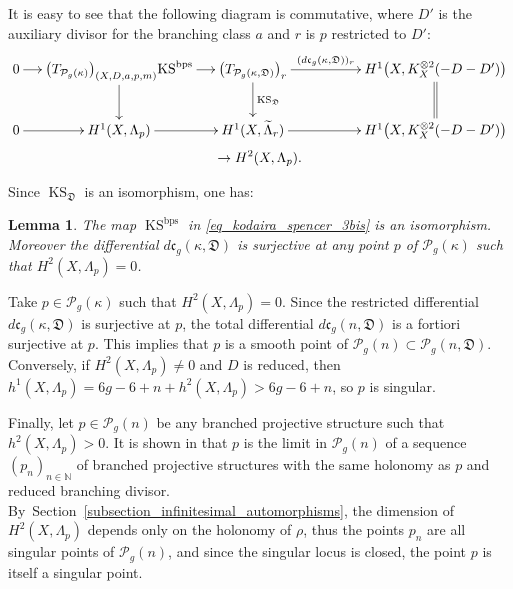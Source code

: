 \documentclass[10pt]{amsart}
\newcommand{\N}{\mathbb N}
\newcommand{\BPS}{\mathrm{bps}}
\DeclareMathOperator{\KS}{KS}
\theoremstyle{definition}
\theoremstyle{plain}
\newtheorem{lemma}[definition]{Lemma}
\begin{document}
It is easy to see that the following diagram is commutative, where $D'$ is the auxiliary divisor for the branching class $a$ and $r$ is $p$ restricted to $D'$:
\begin{multline*}
\xymatrix@C=.45cm{
0 \ar[r] & \bigl(T_{\mathcal P_g(\kappa)}\bigr)_{(X, D, a, p, m)} \ar[d]{\KS^{\BPS}} \ar[r] & \bigl(T_{\mathcal P_g(\kappa, \mathfrak D)}\bigr)_r \ar[d]^{\KS_{\mathfrak D}} \ar[rrr]^-{(d\mathfrak c_g(\kappa,\mathfrak D))_r} &&&H^1\bigl(X, K_X^{\otimes 2}(-D-D')\bigr) \ar@{=}[d]\\
0 \ar [r] & H^1(X, \Lambda_{p}) \ar[r] & H^1(X, \widetilde \Lambda_r) \ar[rrr]&&& H^1\bigl(X, K_X^{\otimes 2}(-D-D')\bigr)}\\
\\[-15pt]
\to H^2(X, \Lambda_p).
\end{multline*}

Since $\KS_{\mathfrak D}$ is an isomorphism, one has:

\begin{lemma}
The map $\KS^{\BPS}$ in \eqref{eq_kodaira_spencer_3bis} is an isomorphism.
Moreover the differential $d\mathfrak c_g(\kappa, \mathfrak D)$ is surjective at any point $p$ of $\mathcal P_g(\kappa)$ such that $H^2\left(X, \Lambda_p\right)=0$.
\end{lemma}

Take $p \in \mathcal P_g(\kappa)$ such that $H^2\left(X, \Lambda_p\right)=0$.
Since the restricted differential $d\mathfrak c_g(\kappa, \mathfrak D)$ is surjective at $p$, the total differential $d\mathfrak c_g(n, \mathfrak D)$ is a fortiori surjective at $p$.
This implies that $p$ is a smooth point of $\mathcal P_g(n) \subset \mathcal P_g(n, \mathfrak D)$.
Conversely, if $H^2\left(X, \Lambda_p\right) \neq 0$ and $D$ is reduced, then $h^1\left(X, \Lambda_p\right) = 6g-6+n+h^2\left(X, \Lambda_p\right) > 6g-6+n$, so $p$ is singular.

Finally, let $p \in \mathcal P_g(n)$ be any branched projective structure such that $h^2(X, \Lambda_p) > 0$.
It is shown in \cite{calsamiglia-deroin-francaviglia} that $p$ is the limit in $\mathcal P_g(n)$ of a sequence $(p_n)_{n \in \N}$ of branched projective structures with the same holonomy as $p$ and reduced branching divisor.
By~Section~\ref{subsection_infinitesimal_automorphisms}, the dimension of $H^2(X, \Lambda_p)$ depends only on the holonomy of $\rho$, thus the points $p_n$ are all singular points of $\mathcal P_g(n)$, and since the singular locus is closed, the point $p$ is itself a singular point.
\end{document}
